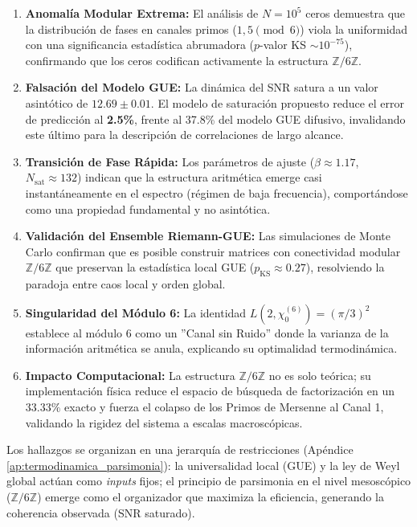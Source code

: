\documentclass[12pt, a4paper]{article}
\theoremstyle{plain}
\theoremstyle{definition}
\theoremstyle{remark}
\newcommand{\Z}{\mathbb{Z}}
\begin{document}
\begin{enumerate}[label=(\arabic*)]
\item \textbf{Anomalía Modular Extrema:} El análisis de $N=10^5$ ceros demuestra que la distribución de fases en canales primos ($1,5 \pmod 6$) viola la uniformidad con una significancia estadística abrumadora ($p$-valor KS $\sim 10^{-75}$), confirmando que los ceros codifican activamente la estructura $\Z/6\Z$.

\item \textbf{Falsación del Modelo GUE:} La dinámica del SNR satura a un valor asintótico de $12.69 \pm 0.01$. El modelo de saturación propuesto reduce el error de predicción al \textbf{2.5\%}, frente al 37.8\% del modelo GUE difusivo, invalidando este último para la descripción de correlaciones de largo alcance.

\item \textbf{Transición de Fase Rápida:} Los parámetros de ajuste ($\beta \approx 1.17$, $N_{\text{sat}} \approx 132$) indican que la estructura aritmética emerge casi instantáneamente en el espectro (régimen de baja frecuencia), comportándose como una propiedad fundamental y no asintótica.

\item \textbf{Validación del Ensemble Riemann-GUE:} Las simulaciones de Monte Carlo confirman que es posible construir matrices con conectividad modular $\Z/6\Z$ que preservan la estadística local GUE ($p_{\text{KS}} \approx 0.27$), resolviendo la paradoja entre caos local y orden global.

\item \textbf{Singularidad del Módulo 6:} La identidad $L(2,\chi_0^{(6)}) = (\pi/3)^2$ establece al módulo 6 como un ''Canal sin Ruido'' donde la varianza de la información aritmética se anula, explicando su optimalidad termodinámica.

\item \textbf{Impacto Computacional:} La estructura $\mathbb{Z}/6\mathbb{Z}$ no es solo teórica; su implementación física reduce el espacio de búsqueda de factorización en un $33.33\%$ exacto y fuerza el colapso de los Primos de Mersenne al Canal 1, validando la rigidez del sistema a escalas macroscópicas.

\end{enumerate} %

Los hallazgos se organizan en una jerarquía de restricciones (Apéndice \ref{ap:termodinamica_parsimonia}): la universalidad local (GUE) y la ley de Weyl global actúan como \textit{inputs} fijos; el principio de parsimonia en el nivel mesoscópico ($\mathbb{Z}/6\mathbb{Z}$) emerge como el organizador que maximiza la eficiencia, generando la coherencia observada (SNR saturado).
\end{document}
